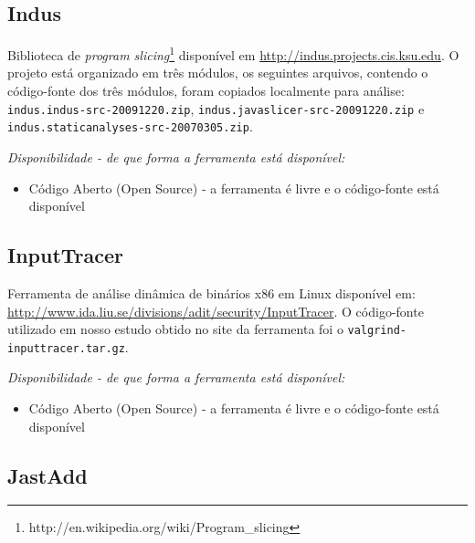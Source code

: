 \subsection{Indus}

Biblioteca de {\it program
slicing}\footnote{http://en.wikipedia.org/wiki/Program\_slicing} disponível em
\url{http://indus.projects.cis.ksu.edu}. O projeto está organizado em três
módulos, os seguintes arquivos, contendo o código-fonte dos três módulos,
foram copiados localmente para análise:
\texttt{indus.indus-src-20091220.zip},
\texttt{indus.javaslicer-src-20091220.zip} e
\texttt{indus.staticanalyses-src-20070305.zip}.

\begin{description}

  \item {\it Disponibilidade - de que forma a ferramenta está disponível:}
    \begin{itemize}
      \item Código Aberto (Open Source) - a ferramenta é livre e o código-fonte está disponível
    \end{itemize}

\end{description}

\subsection{InputTracer}

Ferramenta de análise dinâmica de binários x86 em Linux
disponível em:
\url{http://www.ida.liu.se/divisions/adit/security/InputTracer}. O
código-fonte utilizado em nosso estudo obtido no site da ferramenta foi o
\texttt{valgrind-inputtracer.tar.gz}.

\begin{description}

  \item {\it Disponibilidade - de que forma a ferramenta está disponível:}
    \begin{itemize}
      \item Código Aberto (Open Source) - a ferramenta é livre e o código-fonte está disponível
    \end{itemize}

\end{description}

\subsection{JastAdd}

